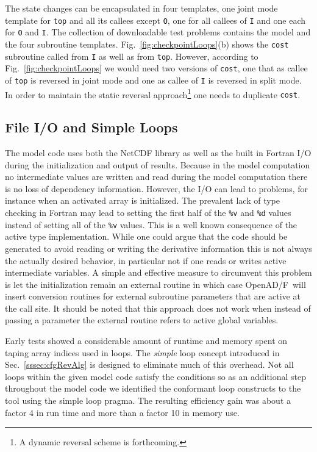 \documentclass{book}
\newcommand{\OpenADF}{OpenAD/F}
\newcommand{\code}[1]{{\small\tt{#1}}}
\newcommand{\refsec}[1]{{Sec.~\ref{#1}}}
\newcommand{\reffig}[1]{{Fig.~\ref{#1}}}
\begin{document}
The state changes can be encapsulated in four templates, one joint mode template for \code{top}
and all its callees except \code{O}, one for all callees of \code{I} and one  each for 
\code{O} and \code{I}.  
The collection of downloadable test problems contains the 
model and the four subroutine templates.
\reffig{fig:checkpointLoops}(b) shows the \code{cost} subroutine called from 
\code{I} as well as from \code{top}. 
However, according to \reffig{fig:checkpointLoops} we would need two versions of 
\code{cost}, one that as callee of \code{top} is reversed in joint mode and 
one as callee of \code{I} is reversed in split mode. In order to maintain 
the static reversal approach\footnote{
A dynamic reversal scheme is forthcoming.
}
one needs to duplicate \code{cost}.

\subsection{File I/O and Simple Loops}
The model code uses both the NetCDF library as well as 
the built in Fortran I/O during the initialization and 
output of results. Because  in the model computation 
no intermediate values are written and read during 
the model computation there is no loss of dependency information. 
However, the I/O can lead to problems, for instance 
when an activated array is initialized. The prevalent 
lack of type checking in Fortran may lead to setting 
the first half of the \code{\%v} and \code{\%d} values 
instead of setting all of the \code{\%v} values. 
This is a well known consequence of the active type 
implementation. While one could argue that the code should 
be generated to avoid reading or writing the derivative information
this is not always the actually desired behavior, in particular 
not if one reads or writes active intermediate variables. 
A simple and effective measure to circumvent this problem 
is let the initialization remain an external routine 
in which case \OpenADF\ will insert conversion routines 
for external subroutine parameters that are active at the 
call site. 
It should be noted that this approach does not work 
when instead of passing a parameter the external routine refers 
to active global variables.
  
Early tests showed a considerable amount of runtime and memory 
spent on taping array indices used in loops. 
The {\em simple} loop concept introduced in \refsec{sssec:cfgRevAlg}
is designed to eliminate much of this overhead. 
Not all loops within the given model code satisfy the conditions 
so as an additional step throughout the model code 
we identified the conformant loop constructs to 
the tool using the simple loop pragma. The resulting efficiency gain
was about a factor 4 in run time and more than a factor 10 in memory 
use.
\end{document}
